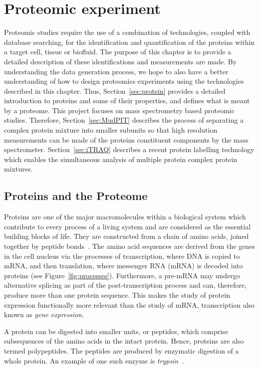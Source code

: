 \documentclass[11pt,a4paper]{article}
\begin{document}
\section{Proteomic experiment}
\label{sec:proteomicExpt}
Proteomic studies require the use of a combination of technologies, coupled with database searching, for the identification and quantification of the proteins within a target cell, tissue or biofluid. The purpose of this chapter is to provide a detailed description of these identifications and measurements are made. By understanding the data generation process, we hope to also have a better understanding of how to design proteomics experiments using the technologies described in this chapter. Thus, Section~\ref{sec:protein} provides a detailed introduction to proteins and some of their properties, and defines what is meant by a proteome.  This project focuses on mass spectrometry based proteomic studies.  Therefore, Section~\ref{sec:MudPIT} describes the process of separating a complex protein mixture into smaller subunits so that high resolution measurements can be made of the proteins constituent components by the mass spectrometer.  Section~\ref{sec:iTRAQ} describes a recent protein labelling technology which enables the simultaneous analysis of multiple protein complex protein mixtures. 

\subsection{Proteins and the Proteome}
\label{subsec:protein}
Proteins are one of the major macromolecules within a biological system which contribute to every process of a living system and are considered as the essential building blocks of life. They are constructed from a chain of amino acids, joined together by peptide bonds~\citep{Eidhammer2008}. The amino acid sequences are derived from the genes in the cell nucleus via the processes of transcription, where DNA is copied to mRNA, and then translation, where messenger RNA (mRNA) is decoded into proteins (see Figure~\ref{fig:processes}). Furthermore, a pre-mRNA may undergo alternative splicing as part of the post-transcription process and can, therefore, produce more than one protein sequence. This makes the study of protein expression functionally more relevant than the study of mRNA, transcription also known as \emph{gene expression}.

A protein can be digested into smaller units, or peptides, which comprise subsequences of the amino acids in the intact protein. Hence, proteins are also termed polypeptides. The peptides are produced by enzymatic digestion of a whole protein. An example of one such enzyme is \emph{trypsin}~\citep{Eidhammer2008}. 
\end{document}

